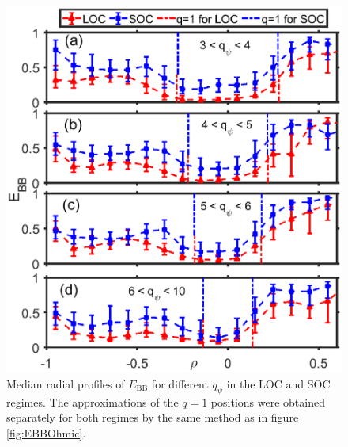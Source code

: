 \begin{figure}[h]
\begin{centering}
\includegraphics[scale=0.6]{fig_EBB_LOCSOC_med.eps}
\par\end{centering}
\caption{Median radial profiles of $E_\mathrm{BB}$ for different $q_{\psi}$ in the LOC and SOC regimes. The approximations of the $q = 1$ positions were obtained separately for both regimes by the same method as in figure \ref{fig:EBBOhmic}.}
\label{fig:ELS_med}
\end{figure}


